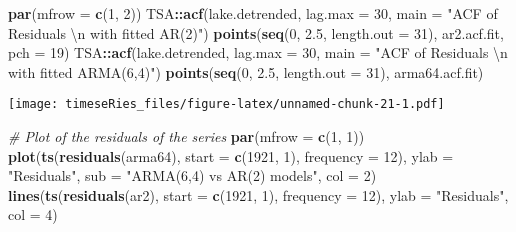 \documentclass[]{book}
\newenvironment{Shaded}{\begin{snugshade}}{\end{snugshade}}
\newcommand{\CharTok}[1]{\textcolor[rgb]{0.31,0.60,0.02}{#1}}
\newcommand{\CommentTok}[1]{\textcolor[rgb]{0.56,0.35,0.01}{\textit{#1}}}
\newcommand{\DataTypeTok}[1]{\textcolor[rgb]{0.13,0.29,0.53}{#1}}
\newcommand{\DecValTok}[1]{\textcolor[rgb]{0.00,0.00,0.81}{#1}}
\newcommand{\FloatTok}[1]{\textcolor[rgb]{0.00,0.00,0.81}{#1}}
\newcommand{\KeywordTok}[1]{\textcolor[rgb]{0.13,0.29,0.53}{\textbf{#1}}}
\newcommand{\NormalTok}[1]{#1}
\newcommand{\OperatorTok}[1]{\textcolor[rgb]{0.81,0.36,0.00}{\textbf{#1}}}
\newcommand{\StringTok}[1]{\textcolor[rgb]{0.31,0.60,0.02}{#1}}
\begin{document}
\begin{Shaded}
\begin{Highlighting}[]
\KeywordTok{par}\NormalTok{(}\DataTypeTok{mfrow =} \KeywordTok{c}\NormalTok{(}\DecValTok{1}\NormalTok{, }\DecValTok{2}\NormalTok{))}
\NormalTok{TSA}\OperatorTok{::}\KeywordTok{acf}\NormalTok{(lake.detrended, }\DataTypeTok{lag.max =} \DecValTok{30}\NormalTok{, }\DataTypeTok{main =} \StringTok{"ACF of Residuals }\CharTok{\textbackslash{}n}\StringTok{ with fitted AR(2)"}\NormalTok{)}
\KeywordTok{points}\NormalTok{(}\KeywordTok{seq}\NormalTok{(}\DecValTok{0}\NormalTok{, }\FloatTok{2.5}\NormalTok{, }\DataTypeTok{length.out =} \DecValTok{31}\NormalTok{), ar2.acf.fit, }\DataTypeTok{pch =} \DecValTok{19}\NormalTok{)}
\NormalTok{TSA}\OperatorTok{::}\KeywordTok{acf}\NormalTok{(lake.detrended, }\DataTypeTok{lag.max =} \DecValTok{30}\NormalTok{, }\DataTypeTok{main =} \StringTok{"ACF of Residuals }\CharTok{\textbackslash{}n}\StringTok{ with fitted ARMA(6,4)"}\NormalTok{)}
\KeywordTok{points}\NormalTok{(}\KeywordTok{seq}\NormalTok{(}\DecValTok{0}\NormalTok{, }\FloatTok{2.5}\NormalTok{, }\DataTypeTok{length.out =} \DecValTok{31}\NormalTok{), arma64.acf.fit)}
\end{Highlighting}
\end{Shaded}

\texttt{[image: timeseRies\_files/figure-latex/unnamed-chunk-21-1.pdf]}

\begin{Shaded}
\begin{Highlighting}[]
\CommentTok{# Plot of the residuals of the series}
\KeywordTok{par}\NormalTok{(}\DataTypeTok{mfrow =} \KeywordTok{c}\NormalTok{(}\DecValTok{1}\NormalTok{, }\DecValTok{1}\NormalTok{))}
\KeywordTok{plot}\NormalTok{(}\KeywordTok{ts}\NormalTok{(}\KeywordTok{residuals}\NormalTok{(arma64), }\DataTypeTok{start =} \KeywordTok{c}\NormalTok{(}\DecValTok{1921}\NormalTok{, }\DecValTok{1}\NormalTok{), }\DataTypeTok{frequency =} \DecValTok{12}\NormalTok{), }\DataTypeTok{ylab =} \StringTok{"Residuals"}\NormalTok{, }
    \DataTypeTok{sub =} \StringTok{"ARMA(6,4) vs AR(2) models"}\NormalTok{, }\DataTypeTok{col =} \DecValTok{2}\NormalTok{)}
\KeywordTok{lines}\NormalTok{(}\KeywordTok{ts}\NormalTok{(}\KeywordTok{residuals}\NormalTok{(ar2), }\DataTypeTok{start =} \KeywordTok{c}\NormalTok{(}\DecValTok{1921}\NormalTok{, }\DecValTok{1}\NormalTok{), }\DataTypeTok{frequency =} \DecValTok{12}\NormalTok{), }\DataTypeTok{ylab =} \StringTok{"Residuals"}\NormalTok{, }
    \DataTypeTok{col =} \DecValTok{4}\NormalTok{)}
\end{Highlighting}
\end{Shaded}
\end{document}
